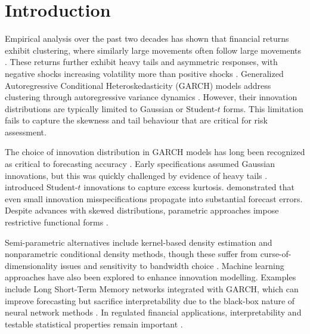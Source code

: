 \documentclass[risks,article,submit,pdftex,moreauthors]{Definitions/mdpi}
\begin{document}
\section{Introduction}

Empirical analysis over the past two decades has shown that financial returns exhibit clustering, where similarly large movements often follow large movements \citep{cont2001empirical, aloud2013stylized}. These returns further exhibit heavy tails and asymmetric responses, with negative shocks increasing volatility more than positive shocks \citep{cont2001empirical}. Generalized Autoregressive Conditional Heteroskedasticity (GARCH) models address clustering through autoregressive variance dynamics \citep{bollerslev1986generalised}. However, their innovation distributions are typically limited to Gaussian or Student-$t$ forms. This limitation fails to capture the skewness and tail behaviour that are critical for risk assessment.

The choice of innovation distribution in GARCH models has long been recognized as critical to forecasting accuracy \citep{bollerslev1987conditionally, ederington2005forecasting}. Early specifications assumed Gaussian innovations, but this was quickly challenged by evidence of heavy tails \citep{bollerslev1986generalised}. \cite{bollerslev1987conditionally} introduced Student-$t$ innovations to capture excess kurtosis. \cite{hansen1994autoregressive} demonstrated that even small innovation misspecifications propagate into substantial forecast errors. Despite advances with skewed distributions, parametric approaches impose restrictive functional forms \citep{fernandez1998multivariate}.

Semi-parametric alternatives include kernel-based density estimation and nonparametric conditional density methods, though these suffer from curse-of-dimensionality issues and sensitivity to bandwidth choice \citep{engle1993measuring, hansen2004nonparametric, silverman1986density}. Machine learning approaches have also been explored to enhance innovation modelling. Examples include Long Short-Term Memory networks integrated with GARCH, which can improve forecasting but sacrifice interpretability due to the black-box nature of neural network methods \citep{kim2018forecasting, hossain2008comparison}. In regulated financial applications, interpretability and testable statistical properties remain important \citep{harvey2022machine, rudin2019stop}.
\end{document}
